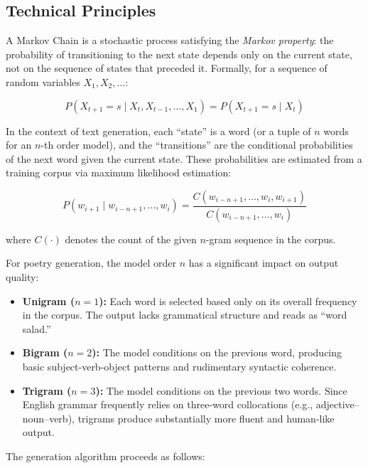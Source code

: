 \documentclass[conference]{IEEEtran}
\begin{document}
\subsection{Technical Principles}

A Markov Chain is a stochastic process satisfying the \textit{Markov property}: the probability of transitioning to the next state depends only on the current state, not on the sequence of states that preceded it. Formally, for a sequence of random variables $X_1, X_2, \ldots$:

\begin{equation}
P(X_{t+1} = s \mid X_t, X_{t-1}, \ldots, X_1) = P(X_{t+1} = s \mid X_t)
\end{equation}

In the context of text generation, each ``state'' is a word (or a tuple of $n$ words for an $n$-th order model), and the ``transitions'' are the conditional probabilities of the next word given the current state. These probabilities are estimated from a training corpus via maximum likelihood estimation:

\begin{equation}
P(w_{i+1} \mid w_{i-n+1}, \ldots, w_i) = \frac{C(w_{i-n+1}, \ldots, w_i, w_{i+1})}{C(w_{i-n+1}, \ldots, w_i)}
\end{equation}

\noindent where $C(\cdot)$ denotes the count of the given $n$-gram sequence in the corpus.

For poetry generation, the model order $n$ has a significant impact on output quality:

\begin{itemize}
    \item \textbf{Unigram ($n{=}1$):} Each word is selected based only on its overall frequency in the corpus. The output lacks grammatical structure and reads as ``word salad.''
    \item \textbf{Bigram ($n{=}2$):} The model conditions on the previous word, producing basic subject-verb-object patterns and rudimentary syntactic coherence.
    \item \textbf{Trigram ($n{=}3$):} The model conditions on the previous two words. Since English grammar frequently relies on three-word collocations (e.g., adjective--noun--verb), trigrams produce substantially more fluent and human-like output.
\end{itemize}

The generation algorithm proceeds as follows:
\end{document}
